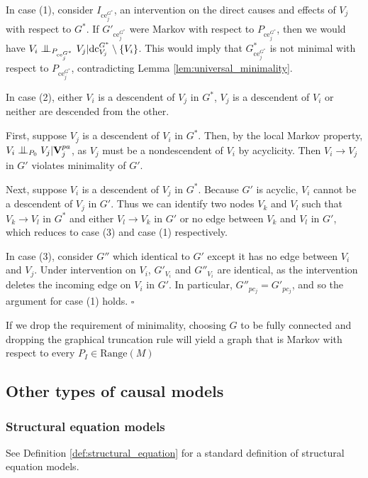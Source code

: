 In case (1), consider $I_{\mathrm{ce}_j^{G^*}}$, an intervention on the direct causes and effects of $V_j$ with respect to $G^*$.  If $G'_{\mathrm{ce}_j^{G^*}}$ were Markov with respect to $P_{\mathrm{ce}_j^{G^*}}$, then we would have $V_i \CI_{P_{{\mathrm{ce}_j^{G^*}}}} V_j | \mathrm{dc}^{G^*}_{V_j}\setminus \{V_i\}$. This would imply that $G^*_{\mathrm{ce}_j^{G^*}}$ is not minimal with respect to $P_{\mathrm{ce}_j^{G^*}}$, contradicting Lemma \ref{lem:universal_minimality}.

In case (2), either $V_i$ is a descendent of $V_j$ in $G^*$, $V_j$ is a descendent of $V_i$ or neither are descended from the other. 

First, suppose $V_j$ is a descendent of $V_i$ in $G^*$. Then, by the local Markov property, $V_i\CI_{P_0} V_j | \mathbf{V}^{pa}_j$, as $V_j$ must be a nondescendent of $V_i$ by acyclicity. Then $V_i\to V_j$ in $G'$ violates minimality of $G'$. 

Next, suppose $V_i$ is a descendent of $V_j$ in $G^*$. Because $G'$ is acyclic, $V_i$ cannot be a descendent of $V_j$ in $G'$. Thus we can identify two nodes $V_k$ and $V_l$ such that $V_k\to V_l$ in $G^*$ and either $V_l\to V_k$ in $G'$ or no edge between $V_k$ and $V_l$ in $G'$, which reduces to case (3) and case (1) respectively.

In case (3), consider $G''$ which identical to $G'$ except it has no edge between $V_i$ and $V_j$. Under intervention on $V_i$, $G'_{V_i}$ and $G''_{V_i}$ are identical, as the intervention deletes the incoming edge on $V_i$ in $G'$. In particular, $G''_{pc_j}=G'_{pc_j}$, and so the argument for case (1) holds. $\square$

 If we drop the requirement of minimality, choosing $G$ to be fully connected and dropping the graphical truncation rule will yield a graph that is Markov with respect to every $P_I\in\mathrm{Range}(M)$

\subsection{Other types of causal models}

\subsubsection{Structural equation models}

See Definition \ref{def:structural_equation} for a standard definition of structural equation models. 

